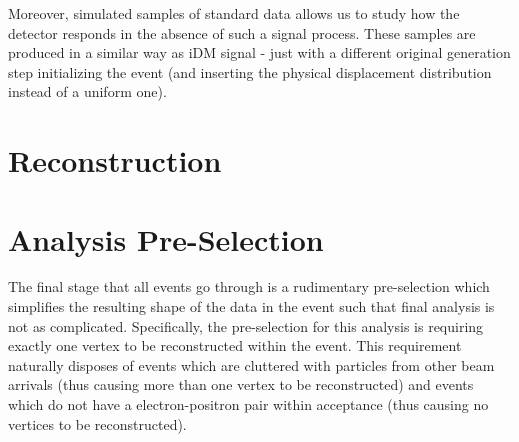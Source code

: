 Moreover, simulated samples of standard data allows us to study how the detector
responds in the absence of such a signal process. These samples are produced in
a similar way as iDM signal - just with a different original generation step
initializing the event (and inserting the physical displacement distribution
instead of a uniform one).

\section{Reconstruction}

\section{Analysis Pre-Selection}
The final stage that all events go through is a rudimentary pre-selection
which simplifies the resulting shape of the data in the event such that final
analysis is not as complicated.
Specifically, the pre-selection for this analysis is requiring exactly one vertex
to be reconstructed within the event.
This requirement naturally disposes of events which are cluttered with particles
from other beam arrivals (thus causing more than one vertex to be reconstructed)
and events which do not have a electron-positron pair within acceptance
(thus causing no vertices to be reconstructed).
